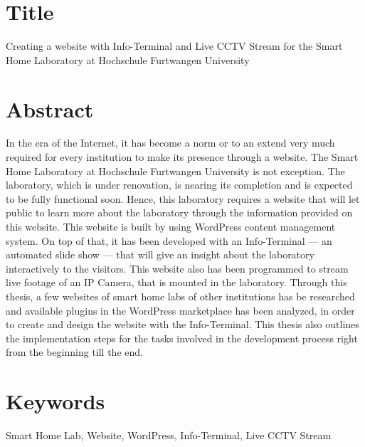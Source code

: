 \section*{Title}
\noindent
Creating a website with Info-Terminal and Live CCTV Stream for the Smart Home Laboratory at Hochschule Furtwangen University

\section*{Abstract}
In the era of the Internet, it has become a norm or to an extend very much required for every institution to make its presence through a website. The Smart Home Laboratory at Hochschule Furtwangen University is not exception. The laboratory, which is under renovation, is nearing its completion and is expected to be fully functional soon. Hence, this laboratory requires a website that will let public to learn more about the laboratory through the information provided on this website. This website is built by using WordPress content management system. On top of that, it has been developed with an Info-Terminal --- an automated slide show --- that will give an insight about the laboratory interactively to the visitors. This website also has been programmed to stream live footage of an IP Camera, that is mounted in the laboratory. Through this thesis, a few websites of smart home labs of other institutions has be researched and available plugins in the WordPress marketplace has been analyzed, in order to create and design the website with the Info-Terminal. This thesis also outlines the implementation steps for the tasks involved in the development process right from the beginning till the end.


\section*{Keywords}
Smart Home Lab, Website, WordPress, Info-Terminal, Live CCTV Stream